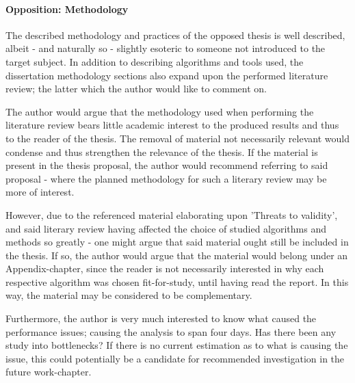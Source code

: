 
\paragraph{Opposition: Methodology}
\label{par:oppositionmethodology}
The described methodology and practices of the opposed thesis is well described, albeit - and naturally so - slightly esoteric to someone not introduced to the target subject.
In addition to describing algorithms and tools used, the dissertation methodology sections also expand upon the performed literature review; the latter which the author would like to comment on.

The author would argue that the methodology used when performing the literature review bears little academic interest to the produced results and thus to the reader of the thesis.
The removal of material not necessarily relevant would condense and thus strengthen the relevance of the thesis.
If the material is present in the thesis proposal, the author would recommend referring to said proposal - where the planned methodology for such a literary review may be more of interest.

However, due to the referenced material elaborating upon 'Threats to validity', and said literary review having affected the choice of studied algorithms and methods so greatly - one might argue that said material ought still be included in the thesis.
If so, the author would argue that the material would belong under an Appendix-chapter, since the reader is not necessarily interested in why each respective algorithm was chosen fit-for-study, until having read the report.
In this way, the material may be considered to be complementary.

Furthermore, the author is very much interested to know what caused the performance issues; causing the analysis to span four days.
Has there been any study into bottlenecks?
If there is no current estimation as to what is causing the issue, this could potentially be a candidate for recommended investigation in the future work-chapter.
